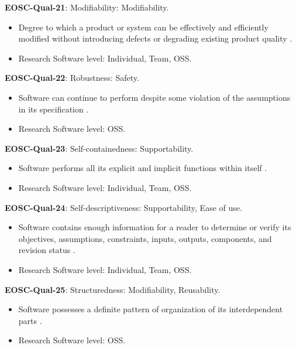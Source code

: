 \textbf{EOSC-Qual-21}: Modifiability: Modifiability.

\begin{itemize}
    \item Degree to which a product or system can be effectively and efficiently modified without introducing defects or degrading existing product quality \cite{iso_25010_2011_2017,boehm_quantitative_1976}.
    \item Research Software level: Individual, Team, OSS.
\end{itemize}

\textbf{EOSC-Qual-22}: Robustness: Safety.

\begin{itemize}
    \item Software can continue to perform despite some violation of the assumptions in its specification \cite{boehm_quantitative_1976}.
    \item Research Software level: OSS.
\end{itemize}

\textbf{EOSC-Qual-23}: Self-containedness: Supportability.

\begin{itemize}
    \item Software performs all its explicit and implicit functions within itself \cite{boehm_quantitative_1976}.
    \item Research Software level: Individual, Team, OSS.
\end{itemize}

\textbf{EOSC-Qual-24}: Self-descriptiveness: Supportability, Ease of use.

\begin{itemize}
    \item Software contains enough information for a reader to determine or verify its objectives, assumptions, constraints, inputs, outputs, components, and revision status \cite{boehm_quantitative_1976}.
    \item Research Software level: Individual, Team, OSS.
\end{itemize}

\textbf{EOSC-Qual-25}: Structuredness: Modifiability, Reusability.

\begin{itemize}
    \item Software possesses a definite pattern of organization of its interdependent parts \cite{boehm_quantitative_1976}.
    \item Research Software level: OSS.
\end{itemize}

